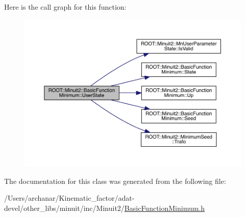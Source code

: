 Here is the call graph for this function\+:
\nopagebreak
\begin{figure}[H]
\begin{center}
\leavevmode
\includegraphics[width=350pt]{de/d25/classROOT_1_1Minuit2_1_1BasicFunctionMinimum_ac1757a094afe32c23b548fafaff5acc1_cgraph}
\end{center}
\end{figure}


The documentation for this class was generated from the following file\+:\begin{DoxyCompactItemize}
\item 
/\+Users/archanar/\+Kinematic\+\_\+factor/adat-\/devel/other\+\_\+libs/minuit/inc/\+Minuit2/\mbox{\hyperlink{adat-devel_2other__libs_2minuit_2inc_2Minuit2_2BasicFunctionMinimum_8h}{Basic\+Function\+Minimum.\+h}}\end{DoxyCompactItemize}
